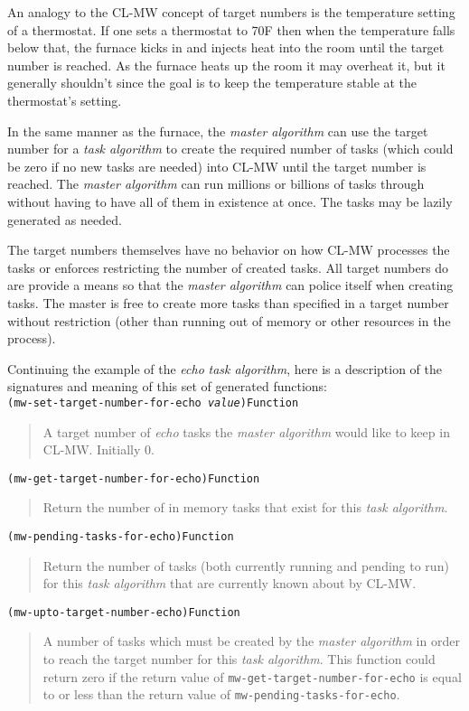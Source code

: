 \documentclass[titlepage,12pt]{book}
\newcommand{\xsmall}{\latexhtml{\small}{}}
\newcommand{\xnormalsize}{\latexhtml{\normalsize}{}}
\newcommand{\clmw}{\xsmall\textsc{CL-MW}\xnormalsize\xspace}
\newcommand{\ma}{\textit{master algorithm}\xspace}
\newcommand{\ta}{\textit{task algorithm}\xspace}
\newcommand{\func}[1]{\mbox{\texttt{#1}}\xspace}
\newcommand{\apifunc}[2]{\noindent\xsmall\texttt{(#1)}\hspace*{\fill}\xnormalsize\texttt{#2}}
\newenvironment{apientry}[2]
	{\apifunc{#1}{#2}\begin{quotation}}
	{\end{quotation}}
\begin{document}
An analogy to the \clmw concept of target numbers is the temperature
setting of a thermostat. If one sets a thermostat to 70{\textdegree}F
then when the temperature falls below that, the furnace kicks in
and injects heat into the room until the target number is reached.
As the furnace heats up the room it may overheat it, but it generally
shouldn't since the goal is to keep the temperature stable at the
thermostat's setting.

In the same manner as the furnace, the \ma can use the target number
for a \ta to create the required number of tasks (which could be
zero if no new tasks are needed) into \clmw until the target number
is reached. The \ma can run millions or billions of tasks through
without having to have all of them in existence at once. The tasks
may be lazily generated as needed.

The target numbers themselves have no behavior on how \clmw processes
the tasks or enforces restricting the number of created tasks.
All target numbers do are provide a means so that the \ma can police
itself when creating tasks. The master is free to create more tasks
than specified in a target number without restriction (other than
running out of memory or other resources in the process).

Continuing the example of the \emph{echo} \ta, here is a description of the
signatures and meaning of this set of generated functions:\\

\begin{apientry}
{mw-set-target-number-for-echo \emph{value}}
{Function}
	A target number of \textit{echo} tasks the \ma would like to keep in
\clmw. Initially 0.
\end{apientry}

\begin{apientry}
{mw-get-target-number-for-echo}
{Function}
	Return the number of in memory tasks that exist for this \ta.
\end{apientry}

\begin{apientry}
{mw-pending-tasks-for-echo}
{Function}
	Return the number of tasks (both currently running and pending
	to run) for this \ta that are currently known about by \clmw.
\end{apientry}

\begin{apientry}
{mw-upto-target-number-echo}
{Function}
	A number of tasks which must be created by the \ma in order
	to reach the target number for this \ta. This function could
	return zero if the return value of \func{mw-get-target-number-for-echo} 
	is equal to or less than the return value of 
	\func{mw-pending-tasks-for-echo}.
\end{apientry}
\end{document}
